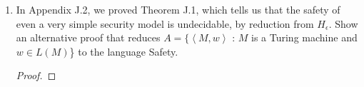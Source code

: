 \documentclass[10pt]{article}
\newcommand{\brackets}[1]{\left< #1 \right>}
\begin{document}
\begin{enumerate}[1)]

\item
In Appendix J.2, we proved Theorem J.1, which tells us that the safety of even a very simple security model is undecidable, by reduction from $H_\epsilon$.  Show an alternative proof that reduces $A = \{\brackets{M, w}$ :  $M$ is a Turing machine and $w \in L(M)$\} to the language Safety.
\begin{proof}[Proof]
\end{proof}
\end{enumerate}
\end{document}
